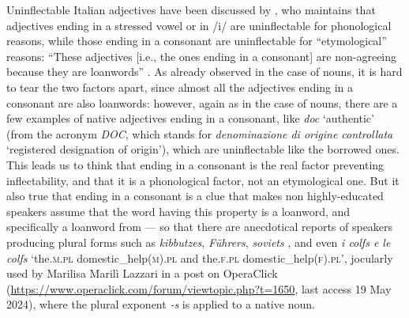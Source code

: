 \documentclass[output=paper,colorlinks,citecolor=brown]{langscibook}
\begin{document}
Uninflectable Italian adjectives have been discussed by \citet{fedden2019}, who maintains that adjectives ending in a stressed vowel or in /i/ are uninflectable for phonological reasons, while those ending in a consonant are uninflectable for ``etymological'' reasons: ``These adjectives [i.e., the ones ending in a consonant] are non-agreeing because they are loanwords'' \citep[308]{fedden2019}. As already observed in the case of nouns, it is hard to tear the two factors apart, since almost all the adjectives ending in a consonant are also loanwords: however, again as in the case of nouns, there are a few examples of native adjectives ending in a consonant, like \emph{doc} `authentic' (from the acronym \emph{DOC}, which stands for \emph{denominazione di origine controllata} `registered designation of origin'), which are uninflectable like the borrowed ones. This leads us to think that ending in a consonant is the real factor preventing inflectability, and that it is a phonological factor, not an etymological one. But it also true that ending in a consonant is a clue that makes non highly-educated speakers assume that the word having this property is a loanword, and specifically a loanword from  --- so that there are anecdotical reports of speakers producing plural forms such as \emph{kibbutzes}, \emph{Führers}, \emph{soviets} \citep[V]{rattimarconimorgavirolando1988}, and even \emph{i colfs e le colfs} `the.\textsc{m.pl} domestic\_help(\textsc{m}).\textsc{pl} and the.\textsc{f.pl} domestic\_help(\textsc{f}).\textsc{pl}', jocularly used by Marilisa Marilì Lazzari in a post on OperaClick (\url{https://www.operaclick.com/forum/viewtopic.php?t=1650}, last
access 19 May 2024), where the  plural exponent \emph{-s} is applied to a native noun.
\end{document}
